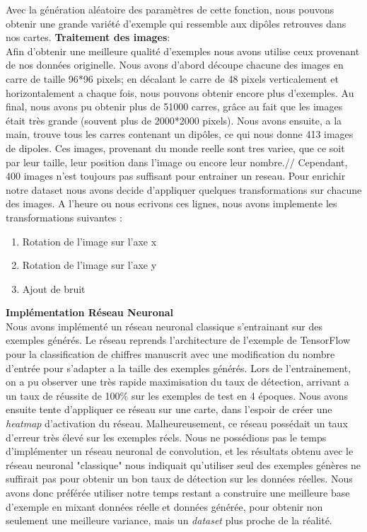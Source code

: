 \documentclass[a4paper, 12pt, titlepage, oneside, french]{article}
\begin{document}
	Avec la génération aléatoire des paramètres de cette fonction, nous pouvons obtenir une grande variété d'exemple qui ressemble aux dipôles retrouves dans nos cartes. 
	\textbf{Traitement des images}:\\
	\indent Afin d'obtenir une meilleure qualité d'exemples nous avons utilise ceux provenant de nos données originelle. Nous avons d'abord découpe chacune des images en carre de taille 96*96 pixels; en décalant le carre de 48 pixels verticalement et horizontalement a chaque fois, nous pouvons obtenir encore plus d'exemples. Au final, nous avons pu obtenir plus de 51000 carres, grâce au fait que les images était très grande (souvent plus de 2000*2000 pixels). Nous avons ensuite, a la main, trouve tous les carres contenant un dipôles, ce qui nous donne 413 images de dipoles. Ces images, provenant du monde reelle sont tres variee, que ce soit par leur taille, leur position dans l'image ou encore leur nombre.//
	Cependant, 400 images n'est toujours pas suffisant pour entrainer un reseau. Pour enrichir notre dataset nous avons decide d'appliquer quelques transformations sur chacune des images. A l'heure ou nous ecrivons ces lignes, nous avons implemente les transformations suivantes :
	\begin{enumerate}
		\item Rotation de l'image sur l'axe x 
		\item Rotation de l'image sur l'axe y
		\item Ajout de bruit
	\end{enumerate}
	
	\textbf{Implémentation Réseau Neuronal}\\
	\indent Nous avons implémenté un réseau neuronal classique s'entrainant sur des exemples générés. Le réseau reprends l'architecture de l'exemple de TensorFlow pour la classification de chiffres manuscrit avec une modification du nombre d'entrée pour s'adapter a la taille des exemples générés. Lors de l'entrainement, on a pu observer une très rapide maximisation du taux de détection, arrivant a un taux de réussite de 100\% sur les exemples de test en 4 époques. Nous avons ensuite tente d'appliquer ce réseau sur une carte, dans l'espoir de créer une \textit{heatmap} d'activation du réseau. Malheureusement, ce réseau possédait un taux d'erreur très élevé sur les exemples réels. Nous ne possédions pas le temps d'implémenter un réseau neuronal de convolution, et les résultats obtenu avec le réseau neuronal "classique" nous indiquait qu'utiliser seul des exemples génères ne suffirait pas pour obtenir un bon taux de détection sur les données réelles. Nous avons donc préférée utiliser notre temps restant a construire une meilleure base d'exemple en mixant données réelle et données générée, pour obtenir non seulement une meilleure variance, mais un \textit{dataset} plus proche de la réalité.
\newpage
\end{document}
